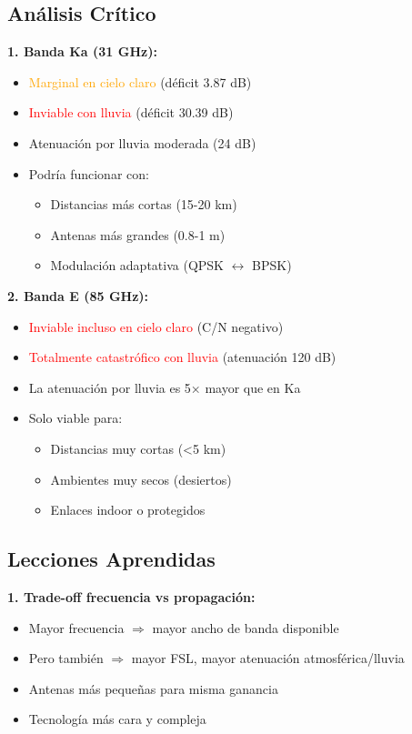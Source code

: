 \documentclass[a4paper,10pt]{article}
\begin{document}
\subsection{Análisis Crítico}

\textbf{1. Banda Ka (31 GHz):}
\begin{itemize}
    \item \textcolor{orange}{Marginal en cielo claro} (déficit 3.87 dB)
    \item \textcolor{red}{Inviable con lluvia} (déficit 30.39 dB)
    \item Atenuación por lluvia moderada (24 dB)
    \item Podría funcionar con:
    \begin{itemize}
        \item Distancias más cortas (15-20 km)
        \item Antenas más grandes (0.8-1 m)
        \item Modulación adaptativa (QPSK $\leftrightarrow$ BPSK)
    \end{itemize}
\end{itemize}

\textbf{2. Banda E (85 GHz):}
\begin{itemize}
    \item \textcolor{red}{Inviable incluso en cielo claro} (C/N negativo)
    \item \textcolor{red}{Totalmente catastrófico con lluvia} (atenuación 120 dB)
    \item La atenuación por lluvia es 5× mayor que en Ka
    \item Solo viable para:
    \begin{itemize}
        \item Distancias muy cortas (<5 km)
        \item Ambientes muy secos (desiertos)
        \item Enlaces indoor o protegidos
    \end{itemize}
\end{itemize}

\subsection{Lecciones Aprendidas}

\textbf{1. Trade-off frecuencia vs propagación:}
\begin{itemize}
    \item Mayor frecuencia $\Rightarrow$ mayor ancho de banda disponible
    \item Pero también $\Rightarrow$ mayor FSL, mayor atenuación atmosférica/lluvia
    \item Antenas más pequeñas para misma ganancia
    \item Tecnología más cara y compleja
\end{itemize}
\end{document}
